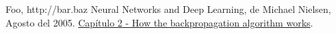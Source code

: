 \documentclass[a4paper]{article}
\begin{document}


\pagestyle{fancy}
\lhead{\slshape \leftmark}
\chead{\scalebox{0.1}{asasasa}}
\renewcommand{\headrulewidth}{0.4pt}
\renewcommand{\footrulewidth}{0.4pt}

  \tableofcontents
  \clearpage

  


  

  





\clearpage
\begin{thebibliography}{3}

  Foo, http://bar.baz
 Neural Networks and Deep Learning, de Michael Nielsen, Agosto del 2005. \href{Capítulo 2}{Capítulo 2 - How the backpropagation algorithm works}.
\end{thebibliography}
\end{document}
